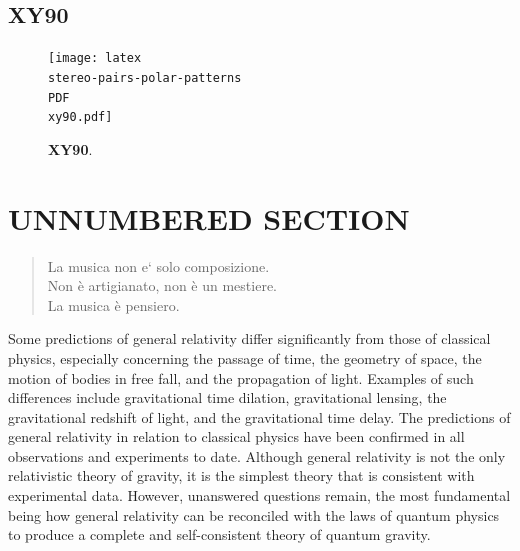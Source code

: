 \subsection*{XY90}
\begin{figure}[b]
\begin{center}
\texttt{[image: latex\\stereo-pairs-polar-patterns\\PDF\\xy90.pdf]}
\caption{\textbf{XY90}.}
\label{xy90}
\end{center}
\end{figure}

\section*{UNNUMBERED SECTION}

\begin{quote}
La musica non e` solo composizione. \\
Non è artigianato, non è un mestiere. \\
La musica è pensiero. \cite{nono85}
\end{quote}

Some predictions of general relativity differ significantly from those of
classical physics, especially concerning the passage of time, the geometry of
space, the motion of bodies in free fall, and the propagation of light. Examples
of such differences include gravitational time dilation, gravitational lensing,
the gravitational redshift of light, and the gravitational time delay. The
predictions of general relativity in relation to classical physics have been
confirmed in all observations and experiments to date. Although general
relativity is not the only relativistic theory of gravity, it is the simplest
theory that is consistent with experimental data. However, unanswered questions
remain, the most fundamental being how general relativity can be reconciled with
the laws of quantum physics to produce a complete and self-consistent theory of
quantum gravity.

